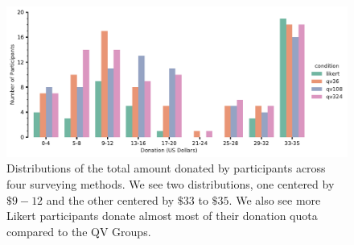 \begin{figure}[htpb]
    \centering
    \includegraphics[width=\textwidth, keepaspectratio=true]{content/image/total_contributions_across_conditions.pdf}
    \caption{
       Distributions of the total amount donated by participants across four surveying methods.
       We see two distributions, one centered by $\$9-12$ and the other centered by $\$33$ to $\$35$.
       We also see more Likert participants donate almost most of their donation quota compared to the QV Groups.
    }
    \label{fig:total_don_exp1}
\end{figure}


